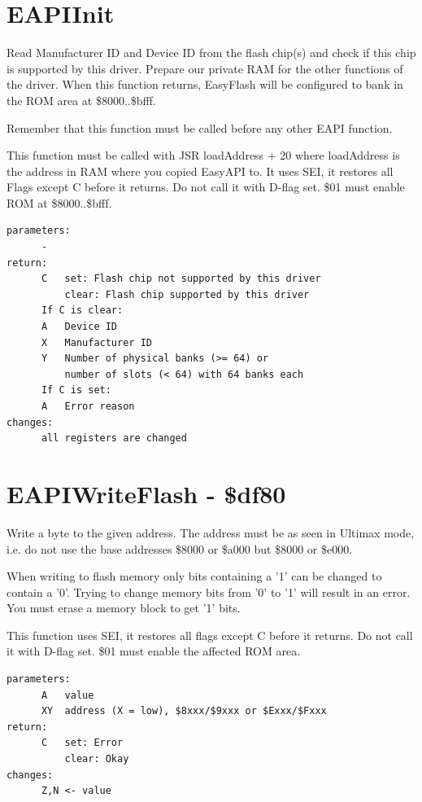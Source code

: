 \documentclass[a4paper,oneside]{memoir}
\begin{document}
\section{EAPIInit}

Read Manufacturer ID and Device ID from the flash chip(s) and check if this
chip is supported by this driver. Prepare our private RAM for the other
functions of the driver. When this function returns, EasyFlash will be
configured to bank in the ROM area at \$8000..\$bfff.

Remember that this function must be called before any other EAPI function.

This function must be called with JSR loadAddress + 20 where loadAddress is the
address in RAM where you copied EasyAPI to.
It uses SEI, it restores all Flags except C before it returns. Do not call it
with D-flag set. \$01 must enable ROM at \$8000..\$bfff.

\begin{verbatim}
parameters:
      -
return:
      C   set: Flash chip not supported by this driver
          clear: Flash chip supported by this driver
      If C is clear:
      A   Device ID
      X   Manufacturer ID
      Y   Number of physical banks (>= 64) or
          number of slots (< 64) with 64 banks each
      If C is set:
      A   Error reason
changes:
      all registers are changed
\end{verbatim}

\section{EAPIWriteFlash - \$df80}

Write a byte to the given address. The address must be as seen in Ultimax
mode, i.e. do not use the base addresses \$8000 or \$a000 but \$8000 or \$e000.

When writing to flash memory only bits containing a '1' can be changed to
contain a '0'. Trying to change memory bits from '0' to '1' will result in
an error. You must erase a memory block to get '1' bits.

This function uses SEI, it restores all flags except C before it returns.
Do not call it with D-flag set. \$01 must enable the affected ROM area.

\begin{verbatim}
parameters:
      A   value
      XY  address (X = low), $8xxx/$9xxx or $Exxx/$Fxxx
return:
      C   set: Error
          clear: Okay
changes:
      Z,N <- value
\end{verbatim}
\end{document}
